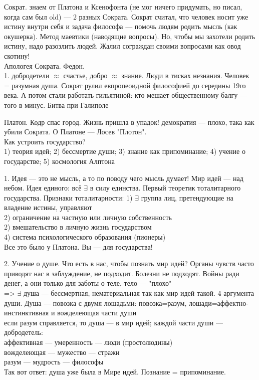 \documentclass[a4paper,12pt]{article}
\begin{document}
Сократ. знаем от Платона и Ксенофонта (не мог ничего придумать, но писал, когда сам был old) --- 2 разных Сократа. Сократ считал, что человек носит уже истину внутри себя и задача философа --- помочь людям родить мысль (как окушерка). Метод маевтики (наводящие вопросы). Но, чтобы мы захотели родить истину, надо разозлить людей. Жалил сограждан своими вопросами как овод скотину!\\
Апологея Сократа. Федон.\\
1. добродетели $\approx$ счастье, добро $\approx$ знание. Люди в тисках незнания. Человек = разумная душа. Сократ рулил евпропеоидной философией до середины 19го века. А потом стали работать гильятиной: кто мешает общественному балгу --- того в минус. Битва при Галиполе

Платон. Кодр спас город. Жизнь пришла в упадок! демократия --- плохо, така как убили Сократа. О Платоне --- Лосев "Плотон". \\
Как устроить государство?\\
1) теория идей; 2) бессмертие души; 3) знание как припоминание; 4) учение о государстве; 5) космология Алптона

1. Идея --- это не мысль, а то по поводу чего мысль думает! Мир идей --- над небом. Идея единого: всё $\exists$ в силу единства. Первый теоретик тоталитарного государства. Признаки тоталитарности:
1) $\exists$ группа лиц, претендующие на владение истины, управляют\\
2) ограничение на частную или личную собственность\\
2) вмешательство в личную жизнь государством\\
4) система психологического образования (пионеры)\\
Все это было у Платона. Вы --- для государства!

2. Учение о душе. Что есть в нас, чтобы познать мир идей? Органы чувств часто приводят нас в заблуждение, не подходит. Болезни не подходят. Войны ради денег, а они только для заботы о теле, тело --- "плохо"\\
=> $\exists$ душа --- бессмертная, нематериальная так как мир идей такой. 4 аргумента души. Душа --- повозка с двумя лошадьми: повозка=разум, лошади=аффектно-инстинктивная и вожделеющая части души\\
если разум справляется, то душа --- в мир идей; каждой части души --- добродетель:\\
аффективная --- умеренность --- люди (простолюдины)\\
вожделеющая --- мужество --- стражи\\
разум --- мудрость --- философы\\
Так вот ответ: душа уже была в Мире идей. Познание = припоминание.
\end{document}
